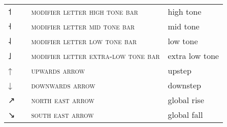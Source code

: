 \begin{center}
\begin{xtabular}{ l L{1.1cm} L{6.2cm} L{3.6cm} }
{˦} &  & \textsc{modifier letter high tone bar} & high tone \\
{˧} &  & \textsc{modifier letter mid tone bar} & mid tone \\
{˨} &  & \textsc{modifier letter low tone bar} & low tone \\
{˩} &  & \textsc{modifier letter extra-low tone bar} & extra low tone \\
{↑} &  & \textsc{upwards arrow} & upstep \\
{↓} &  & \textsc{downwards arrow} & downstep \\
{↗} &  & \textsc{north east arrow} & global rise \\
{↘} &  & \textsc{south east arrow} & global fall \\
\end{xtabular}
\end{center}